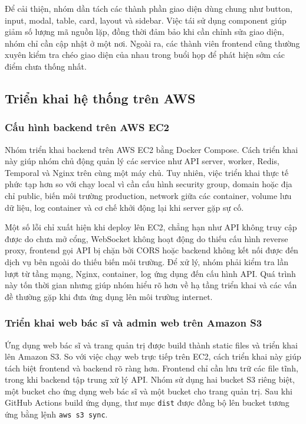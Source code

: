 \par Để cải thiện, nhóm dần tách các thành phần giao diện dùng chung như button, input, modal, table, card, layout và sidebar. Việc tái sử dụng component giúp giảm số lượng mã nguồn lặp, đồng thời đảm bảo khi cần chỉnh sửa giao diện, nhóm chỉ cần cập nhật ở một nơi. Ngoài ra, các thành viên frontend cũng thường xuyên kiểm tra chéo giao diện của nhau trong buổi họp để phát hiện sớm các điểm chưa thống nhất.

\subsection{Triển khai hệ thống trên AWS}

\subsubsection{Cấu hình backend trên AWS EC2}
\par Nhóm triển khai backend trên AWS EC2 bằng Docker Compose. Cách triển khai này giúp nhóm chủ động quản lý các service như API server, worker, Redis, Temporal và Nginx trên cùng một máy chủ. Tuy nhiên, việc triển khai thực tế phức tạp hơn so với chạy local vì cần cấu hình security group, domain hoặc địa chỉ public, biến môi trường production, network giữa các container, volume lưu dữ liệu, log container và cơ chế khởi động lại khi server gặp sự cố.

\par Một số lỗi chỉ xuất hiện khi deploy lên EC2, chẳng hạn như API không truy cập được do chưa mở cổng, WebSocket không hoạt động do thiếu cấu hình reverse proxy, frontend gọi API bị chặn bởi CORS hoặc backend không kết nối được đến dịch vụ bên ngoài do thiếu biến môi trường. Để xử lý, nhóm phải kiểm tra lần lượt từ tầng mạng, Nginx, container, log ứng dụng đến cấu hình API. Quá trình này tốn thời gian nhưng giúp nhóm hiểu rõ hơn về hạ tầng triển khai và các vấn đề thường gặp khi đưa ứng dụng lên môi trường internet.

\subsubsection{Triển khai web bác sĩ và admin web trên Amazon S3}
\par Ứng dụng web bác sĩ và trang quản trị được build thành static files và triển khai lên Amazon S3. So với việc chạy web trực tiếp trên EC2, cách triển khai này giúp tách biệt frontend và backend rõ ràng hơn. Frontend chỉ cần lưu trữ các file tĩnh, trong khi backend tập trung xử lý API. Nhóm sử dụng hai bucket S3 riêng biệt, một bucket cho ứng dụng web bác sĩ và một bucket cho trang quản trị. Sau khi GitHub Actions build ứng dụng, thư mục \texttt{dist} được đồng bộ lên bucket tương ứng bằng lệnh \texttt{aws s3 sync}.

